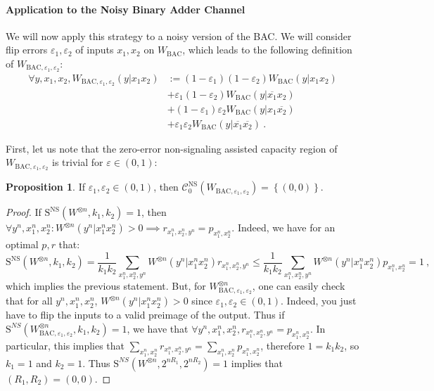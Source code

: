\documentclass[11pt]{article}
\theoremstyle{definition}
\newtheorem{prop}[theo]{Proposition}
\theoremstyle{remark}
\begin{document}
  \paragraph{Application to the Noisy Binary Adder Channel} We will now apply this strategy to a noisy version of the BAC. We will consider flip errors $\varepsilon_1, \varepsilon_2$ of inputs $x_1,x_2$ on $W_{\text{BAC}}$, which leads to the following definition of $W_{\text{BAC},\varepsilon_1, \varepsilon_2}$:
  \begin{equation}
    \begin{aligned}
      \forall y,x_1,x_2, W_{\text{BAC},\varepsilon_1, \varepsilon_2}(y|x_1x_2) &:=  (1-\varepsilon_1)(1-\varepsilon_2) W_{\text{BAC}}(y|x_1x_2)\\
      &+ \varepsilon_1(1-\varepsilon_2) W_{\text{BAC}}(y|\overline{x_1}x_2)\\
      &+ (1-\varepsilon_1)\varepsilon_2 W_{\text{BAC}}(y|x_1\overline{x_2})\\
      &+ \varepsilon_1\varepsilon_2 W_{\text{BAC}}(y|\overline{x_1}\overline{x_2}) \ .
      \end{aligned}
  \end{equation}

  First, let us note that the zero-error non-signaling assisted capacity region of $W_{\text{BAC},\varepsilon_1, \varepsilon_2}$ is trivial for $\varepsilon \in (0,1)$:

  \begin{prop}
    \label{prop:NScapaNoisy}
    If $\varepsilon_1,\varepsilon_2 \in (0,1)$, then $\mathcal{C}_0^{\mathrm{NS}}(W_{\text{BAC},\varepsilon_1, \varepsilon_2}) = \left\{ (0,0) \right\}$.
  \end{prop}
  \begin{proof}
    If $\mathrm{S}^{\mathrm{NS}}(W^{\otimes n},k_1,k_2) = 1$, then $\forall y^n,x_1^n,x_2^n : W^{\otimes n}(y^n|x_1^nx_2^n) > 0 \implies r_{x_1^n,x_2^n,y^n} = p_{x_1^n,x_2^n}$. Indeed, we have for an optimal $p,r$ that:
    \[ \mathrm{S}^{\mathrm{NS}}(W^{\otimes n},k_1,k_2) = \frac{1}{k_1k_2} \sum_{x_1^n,x_2^n,y^n} W^{\otimes n}(y^n|x_1^nx_2^n)r_{x_1^n,x_2^n,y^n} \leq \frac{1}{k_1k_2} \sum_{x_1^n,x_2^n,y^n} W^{\otimes n}(y^n|x_1^nx_2^n)p_{x_1^n,x_2^n} = 1 \ , \]
    which implies the previous statement. But, for $W_{\text{BAC},\varepsilon_1, \varepsilon_2}^{\otimes n}$, one can easily check that for all $y^n,x_1^n,x_2^n$, $W^{\otimes n}(y^n|x_1^nx_2^n) > 0$ since $\varepsilon_1,\varepsilon_2 \in (0,1)$. Indeed, you just have to flip the inputs to a valid preimage of the output. Thus if $\mathrm{S}^{NS}(W_{\text{BAC},\varepsilon_1, \varepsilon_2}^{\otimes n},k_1,k_2) = 1$, we have that $\forall y^n,x_1^n,x_2^n, r_{x_1^n,x_2^n,y^n} = p_{x_1^n,x_2^n}$. In particular, this implies that $\sum_{x_1^n,x_2^n} r_{x_1^n,x_2^n,y^n} = \sum_{x_1^n,x_2^n} p_{x_1^n,x_2^n}$, therefore $1 = k_1k_2$, so $k_1 = 1$ and $k_2 = 1$. Thus $\mathrm{S}^{NS}(W^{\otimes n},2^{nR_1},2^{nR_2}) = 1$ implies that $(R_1,R_2)=(0,0)$. 
  \end{proof}
\end{document}
